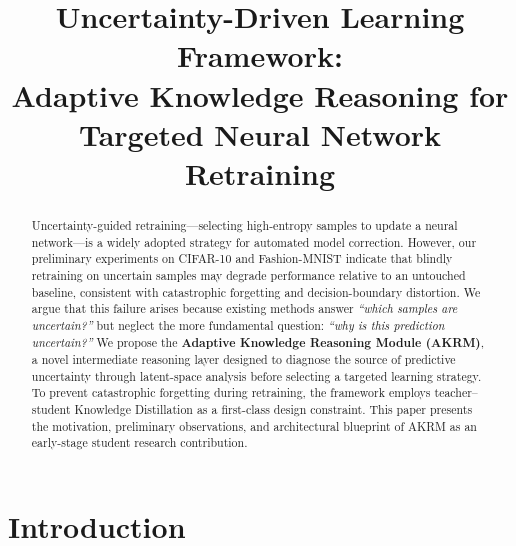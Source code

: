 \documentclass[conference]{IEEEtran}
\begin{document}
\title{Uncertainty-Driven Learning Framework:\\Adaptive Knowledge Reasoning for\\Targeted Neural Network Retraining}

\author{
}

\maketitle

\begin{abstract}
Uncertainty-guided retraining---selecting high-entropy samples to update a neural network---is a widely adopted strategy for automated model correction. However, our preliminary experiments on CIFAR-10 and Fashion-MNIST indicate that blindly retraining on uncertain samples may degrade performance relative to an untouched baseline, consistent with catastrophic forgetting and decision-boundary distortion. We argue that this failure arises because existing methods answer \emph{``which samples are uncertain?''} but neglect the more fundamental question: \emph{``why is this prediction uncertain?''} We propose the \textbf{Adaptive Knowledge Reasoning Module (AKRM)}, a novel intermediate reasoning layer designed to diagnose the source of predictive uncertainty through latent-space analysis before selecting a targeted learning strategy. To prevent catastrophic forgetting during retraining, the framework employs teacher--student Knowledge Distillation as a first-class design constraint. This paper presents the motivation, preliminary observations, and architectural blueprint of AKRM as an early-stage student research contribution.
\end{abstract}

\section{Introduction}
\end{document}
